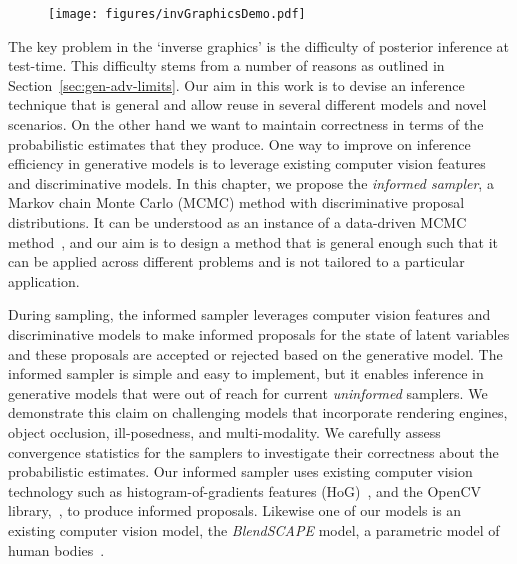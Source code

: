 \begin{figure}[t]
\begin{center}
\centerline{\texttt{[image: figures/invGraphicsDemo.pdf]}}
\label{fig:teaser}
\end{center}
\end{figure}

The key problem in the `inverse graphics' is the difficulty of
posterior inference at test-time.
This difficulty stems from a number of reasons as outlined in
Section~\ref{sec:gen-adv-limits}.
Our aim in this work is to devise an inference technique that is general
and allow reuse in several different models and novel scenarios.
On the other hand we want to maintain correctness in terms of the probabilistic
estimates that they produce. One way to improve on inference
efficiency in generative models is to leverage existing computer vision
features and discriminative models.
%
In this chapter, we propose the \emph{informed sampler}, a Markov chain
Monte Carlo (MCMC) method with discriminative proposal distributions.
It can be understood as an instance of a data-driven MCMC
method~\cite{zhu2000integrating}, and our aim is to design a method that
is general enough such that it can be applied across different
problems and is not tailored to a particular application.

%
During sampling, the informed sampler leverages computer vision
features and discriminative models to make informed proposals for the state
of latent variables and
these proposals are accepted or rejected based on the generative model.
The informed sampler is simple and easy to implement, but it enables inference
in generative models that were out of reach for current \emph{uninformed}
samplers.
We demonstrate this claim on challenging models that incorporate
rendering engines, object occlusion, ill-posedness, and
multi-modality. We carefully assess convergence statistics for the
samplers to investigate their correctness about the probabilistic
estimates.
%
Our informed sampler uses existing computer vision technology such as
histogram-of-gradients features (HoG)~\cite{dalal2005histograms}, and the OpenCV
library,~\cite{bradski2008opencv}, to produce informed proposals.
%
Likewise one of our models is an existing computer vision model,
the \emph{BlendSCAPE} model, a parametric model of human
bodies~\cite{hirshberg2012coregistration}.
%

